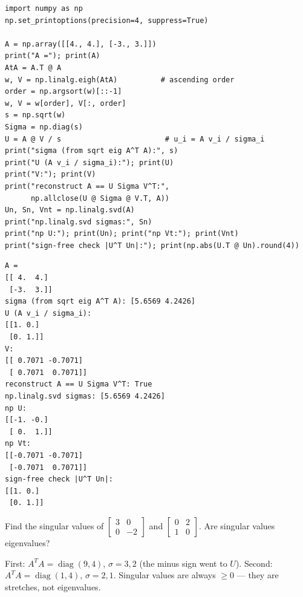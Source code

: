 \begin{lstlisting}[caption={\ttfamily code/ch10\_svd\_from\_ata.py --- the
$A^{T}A$ construction verified against \ttfamily np.linalg.svd; watch the
sign ambiguity show up live.}]
import numpy as np
np.set_printoptions(precision=4, suppress=True)

A = np.array([[4., 4.], [-3., 3.]])
print("A ="); print(A)
AtA = A.T @ A
w, V = np.linalg.eigh(AtA)          # ascending order
order = np.argsort(w)[::-1]
w, V = w[order], V[:, order]
s = np.sqrt(w)
Sigma = np.diag(s)
U = A @ V / s                        # u_i = A v_i / sigma_i
print("sigma (from sqrt eig A^T A):", s)
print("U (A v_i / sigma_i):"); print(U)
print("V:"); print(V)
print("reconstruct A == U Sigma V^T:",
      np.allclose(U @ Sigma @ V.T, A))
Un, Sn, Vnt = np.linalg.svd(A)
print("np.linalg.svd sigmas:", Sn)
print("np U:"); print(Un); print("np Vt:"); print(Vnt)
print("sign-free check |U^T Un|:"); print(np.abs(U.T @ Un).round(4))
\end{lstlisting}

\begin{lstlisting}[caption={Output of the SVD assembly. Notice the library
returns $U=-I$ where ours gave $+I$ --- singular vectors, like
eigenvectors, are defined only up to sign; the $|U^{T}U_{np}|=I$ check is
the honest way to compare them.}]
A =
[[ 4.  4.]
 [-3.  3.]]
sigma (from sqrt eig A^T A): [5.6569 4.2426]
U (A v_i / sigma_i):
[[1. 0.]
 [0. 1.]]
V:
[[ 0.7071 -0.7071]
 [ 0.7071  0.7071]]
reconstruct A == U Sigma V^T: True
np.linalg.svd sigmas: [5.6569 4.2426]
np U:
[[-1. -0.]
 [ 0.  1.]]
np Vt:
[[-0.7071 -0.7071]
 [-0.7071  0.7071]]
sign-free check |U^T Un|:
[[1. 0.]
 [0. 1.]]
\end{lstlisting}

\begin{exercise}[easy]
Find the singular values of $\begin{bmatrix}3&0\\0&-2\end{bmatrix}$ and
$\begin{bmatrix}0&2\\1&0\end{bmatrix}$. Are singular values eigenvalues?
\begin{solution}
First: $A^{T}A=\operatorname{diag}(9,4)$, $\sigma=3,2$ (the minus sign
went to $U$). Second: $A^{T}A=\operatorname{diag}(1,4)$, $\sigma=2,1$.
Singular values are always $\ge0$ --- they are stretches, not eigenvalues.
\end{solution}
\end{exercise}

